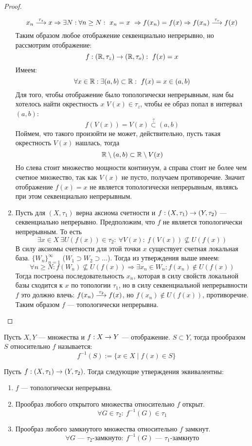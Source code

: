 \begin{proof}
\begin{enumerate}
	$$
	x_n \stackrel{\tau_z}{\longrightarrow} x \Rightarrow \exists N: \forall n \geq N: \ x_n = x \ \Rightarrow f(x_n) = f(x) \Rightarrow f(x_n) \stackrel{\tau_o}{\longrightarrow} f(x)
	$$
	Таким образом любое отображение секвенциально непрерывно, но рассмотрим отображение:
	$$
	f: (\mathbb{R}, \tau_z) \rightarrow (\mathbb{R}, \tau_o) :\ f(x) = x
	$$
	Имеем:
	$$
	\forall x \in \mathbb{R}: \exists (a,b) \subset \mathbb{R} :\ f(x) = x \in (a,b)
	$$
	Для того, чтобы отображение было топологически непрерывным, нам бы хотелось найти окрестность $x$ $V(x) \in \tau_z$, чтобы ее образ  попал в интервал $(a,b)$: 
	$$
	f(V(x)) = V(x) \stackrel{?}{\subset} (a,b)
	$$ 
	Поймем, что такого произойти не может, действительно, пусть такая окрестность $V(x)$ нашлась, тогда
	$$
	\mathbb{R} \setminus (a,b) \subset \mathbb{R} \setminus V(x) 
	$$
	Но слева стоит множество мощности континуум, а справа стоит не более чем счетное множество, так как $V(x)$ не пусто, получаем противоречие. Значит отображение $f(x) = x$ не является топологически непрерывным, являясь при этом секвенциально непрерывным. 
	\item Пусть для $(X, \tau_1)$ верна аксиома счетности и $f : (X, \tau_1) \rightarrow (Y, \tau_2)$ --- секвенциально непрерывно. Предположим, что $f$ не является топологически непрерывным. То есть 
	$$
	\exists x \in X \ \exists U(f(x)) \in \tau_2: \ \forall V(x): \ f(V(x)) \nsubseteq U(f(x))	$$
	В силу аксиомы счетности для этой точки $x$ существует счетная локальная база. $\{W_n\}_{n=1}^{\infty}$ ($W_1 \supset W_2 \supset \dots $). Тогда из утверждения выше имеем:
	$$
	\forall n \geq N : f(W_n) \nsubseteq U(f(x)) \Rightarrow \exists x_n \in W_n: f(x_n) \notin U(f(x))
	$$
	Тогда построена последовательность $x_n$, которая в силу свойств локальной базы сходится к $x$ по топологии $\tau_1$, но в силу секвенциальной непрерывности $f$ это должно влечь: $f(x_n) \stackrel{\tau_2}{\longrightarrow} f(x)$, но $f(x_n) \notin U(f(x))$, противоречие. Таким образом $f$ --- топологически непрерывна.
\end{enumerate}
\end{proof}
\begin{definition}
	Пусть $X,Y$ --- множества и $f: X \rightarrow Y$ --- отображение. $ S \subset Y$, тогда прообразом $S$ относительно $f$ называется:
	$$
	f^{-1}(S) := \{ x \in X \mid f(x) \in S\}
	$$
\end{definition}
\begin{theorem}
	\label{th:ctc}
	Пусть $f: (X, \tau_1)\rightarrow(Y,\tau_2)$. Тогда следующие утверждения эквивалентны:
	\begin{enumerate}
		\item $f$ --- топологически непрерывна. 
		\item Прообраз любого открытого множества относительно $f$ открыт.
		$$
		\forall G \in \tau_2: \ f^{-1}(G) \in \tau_1
		$$ 
		\item Прообраз любого замкнутого множества относительно $f$ замкнут. 
		$$
		\forall G \text{ --- $\tau_2$-замкнуто}: \ f^{-1}(G) \text{ --- $\tau_1$-замкнуто}
		$$
	\end{enumerate} 
	
\end{theorem}
